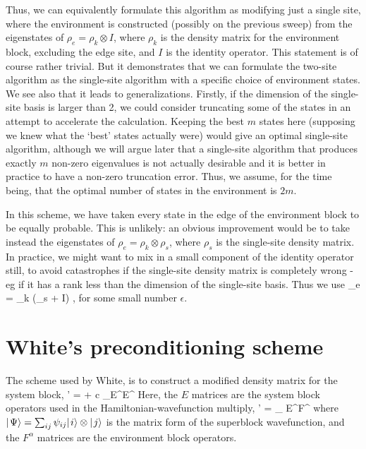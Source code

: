 \documentclass{article}[10pt]
\begin{document}
Thus, we can equivalently formulate this algorithm as modifying just a single site, where
the environment is constructed (possibly on the previous sweep) from the eigenstates of
$\rho_e = \rho_k \otimes I$, where $\rho_k$ is the density matrix for the environment block,
excluding the edge site, and $I$ is the identity operator. This statement is of course
rather trivial. But it demonstrates that we can formulate the two-site algorithm as
the single-site algorithm with a specific choice of environment states.
We see also that it leads to generalizations. Firstly, if the dimension of the
single-site basis is larger than 2, we could consider truncating some of the states in an
attempt to accelerate the calculation. Keeping the best $m$ states here (supposing we
knew what the `best' states actually were) would give an optimal single-site algorithm,
although we will argue later that a single-site algorithm that produces exactly $m$ non-zero
eigenvalues is not actually desirable and it is better in practice to have a non-zero truncation
error. Thus, we assume, for the time being, that the optimal number of states in the 
environment is $2m$.

In this scheme, we have taken every state in the edge of the environment block to be equally
probable. This is unlikely: an obvious improvement would be to take instead the eigenstates of
$\rho_e = \rho_k \otimes \rho_s$, where $\rho_s$ is the single-site density matrix. 
In practice, we might want to mix in a small component of the identity operator still, to
avoid catastrophes if the single-site density matrix is completely wrong - eg if it has
a rank less than the dimension of the single-site basis. Thus we use
\beq
\rho_e = \rho_k \otimes (\rho_s + \epsilon I) \; ,
\eeq
for some small number $\epsilon$.

\section{White's preconditioning scheme}
The scheme used by White, is to construct a modified density matrix for the system block,
\beq
\rho' = \rho + c \sum_\alpha E^\alpha \rho E^{\alpha\dagger}
\eeq
Here, the $E$ matrices are the system block operators used in the Hamiltonian-wavefunction multiply,
\beq
\Psi' = \sum_{\alpha} E^\alpha \psi F^{\alpha\dagger}
\eeq
where $\hbox{$\mid \! {\Psi} \rangle$} = \sum_{ij} \psi_{ij} \hbox{$\mid \! {i} \rangle$} \otimes \hbox{$\mid \! {j} \rangle$}$ is the matrix form of the
superblock wavefunction, and the $F^\alpha$ matrices are the environment block operators.
\end{document}
